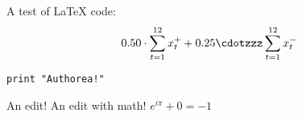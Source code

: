 A test of LaTeX code: \[ 0.50 \cdot \sum_{t = 1}^{12} x_t^+ + 0.25 \cdotzzz \sum_{t = 1}^{12} x_t^- \]

\verb|print "Authorea!"|

An edit! An edit with math! $e^{i\pi} + 0 = -1$



